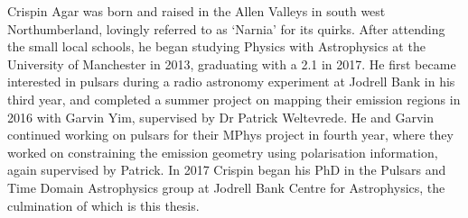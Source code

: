\begin{prefacestatement}
    \addchaptertocentry{\prefacename} %
    Crispin Agar was born and raised in the Allen Valleys in south west Northumberland, lovingly referred to as `Narnia' for its quirks.
    After attending the small local schools, he began studying Physics with Astrophysics at the University of Manchester in 2013, graduating with a 2.1 in 2017. 
    He first became interested in pulsars during a radio astronomy experiment at Jodrell Bank in his third year, and completed a summer project on mapping their emission regions in 2016 with Garvin Yim, supervised by Dr Patrick Weltevrede.
    He and Garvin continued working on pulsars for their MPhys project in fourth year, where they worked on constraining the emission geometry using polarisation information, again supervised by Patrick. 
    In 2017 Crispin began his PhD in the Pulsars and Time Domain Astrophysics group at Jodrell Bank Centre for Astrophysics, the culmination of which is this thesis.
\end{prefacestatement}